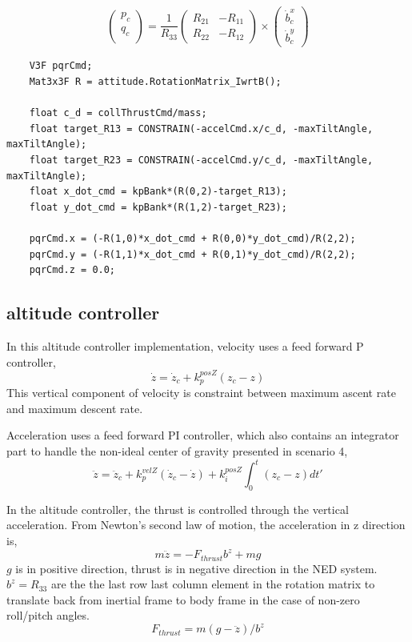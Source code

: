 \documentclass[a4paper]{article}
\begin{document}
$$
\begin{pmatrix} p_c \\ q_c \\ \end{pmatrix}  = \frac{1}{R_{33}}\begin{pmatrix} R_{21} & -R_{11} \\ R_{22} & -R_{12} \end{pmatrix} \times \begin{pmatrix} \dot{b}^x_c \\ \dot{b}^y_c  \end{pmatrix} 
$$

\begin{lstlisting}
    V3F pqrCmd;
    Mat3x3F R = attitude.RotationMatrix_IwrtB();
    
    float c_d = collThrustCmd/mass;
    float target_R13 = CONSTRAIN(-accelCmd.x/c_d, -maxTiltAngle, maxTiltAngle);
    float target_R23 = CONSTRAIN(-accelCmd.y/c_d, -maxTiltAngle, maxTiltAngle);
    float x_dot_cmd = kpBank*(R(0,2)-target_R13);
    float y_dot_cmd = kpBank*(R(1,2)-target_R23);
    
    pqrCmd.x = (-R(1,0)*x_dot_cmd + R(0,0)*y_dot_cmd)/R(2,2);
    pqrCmd.y = (-R(1,1)*x_dot_cmd + R(0,1)*y_dot_cmd)/R(2,2);
    pqrCmd.z = 0.0;
\end{lstlisting}

\subsection{altitude controller}

In this altitude controller implementation, velocity uses a feed forward P controller,
$$\dot{z} = \dot{z}_c  + k_{p}^{posZ}(z_{c} - z) $$
This vertical component of velocity is constraint between maximum ascent rate and maximum descent rate.

Acceleration uses a feed forward PI controller, which also contains an integrator part to handle the non-ideal center of gravity presented in scenario 4,
$$\ddot{z} = \ddot{z}_c + k_{p}^{velZ}(\dot{z}_{c} - \dot{z}) + k_i^{posZ}\int_0^t(z_{c} - z)dt'$$ 

In the altitude controller, the thrust is controlled through the vertical acceleration. From Newton's second law of motion, the acceleration in z direction is,
$$ m \ddot{z} = - F_{thrust} b^z + m g$$
$g$ is in positive direction, thrust is in negative direction in the NED system. $b^z = R_{33}$ are the the last row last column element in the rotation matrix to translate back from inertial frame to body frame in the case of non-zero roll/pitch angles.
$$ F_{thrust} = m (g - \ddot{z})/b^z$$ 
\end{document}
